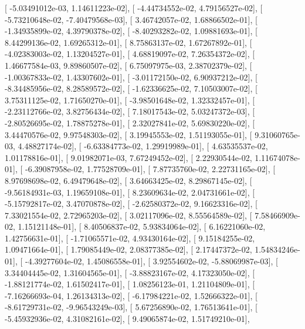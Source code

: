 \documentclass{article}
\begin{document}
       [ -5.03491012e-03,   1.14611223e-02],
       [ -4.44734552e-02,   4.79156527e-02],
       [ -5.73210648e-02,  -7.40479568e-03],
       [  3.46742057e-02,   1.68866502e-01],
       [ -1.34935899e-02,   4.39790378e-02],
       [ -8.40293282e-02,   1.09881693e-01],
       [  8.44299136e-02,   1.69265312e-01],
       [  8.75863137e-02,   1.67267892e-01],
       [ -4.02383003e-02,   1.13204527e-01],
       [  4.68819097e-02,   7.26354372e-02],
       [  1.46677584e-03,   9.89860507e-02],
       [  6.75097975e-03,   2.38702379e-02],
       [ -1.00367833e-02,   1.43307602e-01],
       [ -3.01172150e-02,   6.90937212e-02],
       [ -8.34485956e-02,   8.28589572e-02],
       [ -1.62336625e-02,   7.10503007e-02],
       [  3.75311125e-02,   1.71650270e-01],
       [ -3.98501648e-02,   1.32332457e-01],
       [ -2.23112766e-02,   3.82756434e-02],
       [  7.18017543e-02,   5.03247372e-03],
       [ -2.80526695e-02,   1.78875278e-01],
       [  2.32027841e-02,   5.69830220e-02],
       [  3.44470576e-02,   9.97548303e-02],
       [  3.19945553e-02,   1.51193055e-01],
       [  9.31060765e-03,   4.48827174e-02],
       [ -6.63384773e-02,   1.29919989e-01],
       [  4.63535537e-02,   1.01178816e-01],
       [  9.01982071e-03,   7.67249452e-02],
       [  2.22930544e-02,   1.11674078e-01],
       [ -6.39087958e-02,   1.77528709e-01],
       [  7.87735760e-02,   2.22731165e-02],
       [  8.97698698e-02,   6.49479648e-02],
       [  3.64663425e-02,   8.29867145e-02],
       [ -9.56184931e-03,   1.19659108e-01],
       [  8.23609634e-02,   2.04731661e-02],
       [ -5.15792817e-02,   3.47070878e-02],
       [ -2.62580372e-02,   9.16623316e-02],
       [  7.33021554e-02,   2.72965203e-02],
       [  3.02117096e-02,   8.55564589e-02],
       [  7.58466909e-02,   1.15121148e-01],
       [  8.40506837e-02,   5.93834064e-02],
       [  6.16221060e-02,   1.42756631e-01],
       [ -1.71065571e-02,   4.93430164e-02],
       [  9.15184255e-02,   1.09471664e-01],
       [  1.79085449e-02,   2.08377385e-02],
       [  2.17447372e-02,   1.54834246e-01],
       [ -4.39277604e-02,   1.45086558e-01],
       [  3.92554602e-02,  -5.88069987e-03],
       [  3.34404445e-02,   1.31604565e-01],
       [ -3.88823167e-02,   4.17323050e-02],
       [ -1.88121774e-02,   1.61502417e-01],
       [  1.08256123e-01,   1.21104809e-01],
       [ -7.16266693e-04,   1.26134313e-02],
       [ -6.17984221e-02,   1.52666322e-01],
       [ -8.61729731e-02,  -9.96543249e-03],
       [  5.67256890e-02,   1.76513641e-01],
       [ -5.45932936e-02,   4.31082161e-02],
       [  9.49065874e-02,   1.51749210e-01],
\end{document}

